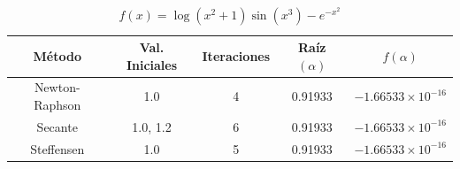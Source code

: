 \begin{table}[H]
\centering

\renewcommand{\arraystretch}{1.3} %
\setlength{\tabcolsep}{12pt}      %

\begin{tabular}{ccccc}
\hline
Método & Val. Iniciales & Iteraciones & Raíz $(\alpha)$ & $f(\alpha)$ \\
\hline

Newton-Raphson & 1.0      & 4 & 0.91933 & $-1.66533\times10^{-16}$ \\

Secante        & 1.0, 1.2 & 6 & 0.91933 & $-1.66533\times10^{-16}$ \\

Steffensen     & 1.0      & 5 & 0.91933 & $-1.66533\times10^{-16}$ \\

\hline
\end{tabular}

\caption{$f(x) = \log{\left(x^{2} + 1 \right)} \sin{\left(x^{3} \right)} - e^{- x^{2}}$}
\end{table}


